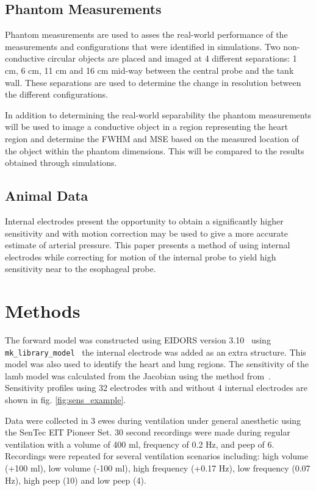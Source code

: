 \subsection{Phantom Measurements}
Phantom measurements are used to asses the real-world performance 
of the measurements and configurations 
that were identified in simulations. Two non-conductive circular 
objects are placed and imaged at 4 different separations: 
1 cm, 6 cm, 11 cm and 16 cm 
mid-way between the central probe and the tank wall. 
These separations are used to determine the change 
in resolution between the different configurations. 

In addition to determining the real-world separability the phantom measurements will be used to image a conductive object in a region 
representing the heart region and determine the FWHM and MSE based on the measured location of the object within the phantom dimensions. 
This will be compared to the results obtained through simulations.

\subsection{Animal Data}

Internal electrodes present the opportunity to obtain
a significantly higher sensitivity and with motion correction 
may be used to give a more accurate estimate of arterial pressure.
This paper presents a method of using internal electrodes
while correcting for motion of the internal probe to yield 
high sensitivity near to the esophageal probe.

\section{Methods}
The forward model was constructed using EIDORS version 
3.10~\cite{Adler2019} using \verb!mk_library_model!~\cite{Grychtol2012} 
the internal electrode was added
as an extra structure. This model was also used
to identify the heart and lung regions.
The sensitivity of the lamb model was calculated from 
the Jacobian using 
the method from~\cite{Stowe2020}.
Sensitivity profiles using 32 electrodes with
and without 4 internal electrodes
are shown in fig. \ref{fig:sens_example}.

Data were collected in 3 ewes during ventilation 
under general anesthetic using the
SenTec EIT Pioneer Set.
30 second recordings were
made during regular ventilation with a volume of 
400  ml, frequency of 0.2  Hz, and peep of 6.
Recordings were repeated for several 
ventilation scenarios including: high volume (+100 ml),
low volume (-100 ml), 
high frequency (+0.17 Hz), 
low frequency (0.07 Hz), 
high peep (10) and low peep (4). 

